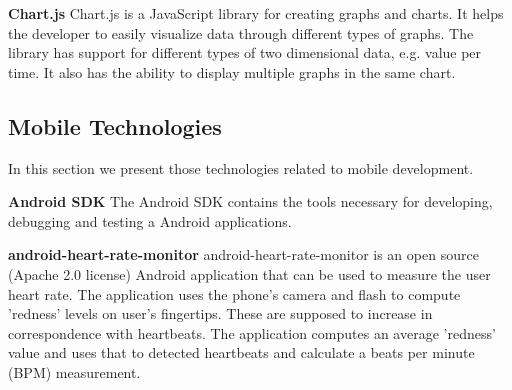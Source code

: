 \textbf{Chart.js}\cite{Chartjs}\newline
Chart.js is a JavaScript library for creating graphs and charts.
It helps the developer to easily visualize data through different types of graphs.
The library has support for different types of two dimensional data, e.g. value per time.
It also has the ability to display multiple graphs in the same chart. 


\subsection{Mobile Technologies}
In this section we present those technologies related to mobile development.

\textbf{Android SDK}\cite{AndroidSDK}\newline
The Android SDK contains the tools necessary for developing, debugging and testing a Android applications.

\textbf{android-heart-rate-monitor}\cite{AndroidHeartRateMonitor}\newline
\label{subsec:hr}
android-heart-rate-monitor is an open source (Apache 2.0 license) Android application that can be used to measure
the user heart rate. The application uses the phone's camera and flash to compute 'redness' levels on user's fingertips. 
These are supposed to increase in correspondence with heartbeats. The application computes an average 'redness' value
and uses that to detected heartbeats and calculate a beats per minute (BPM) measurement.

